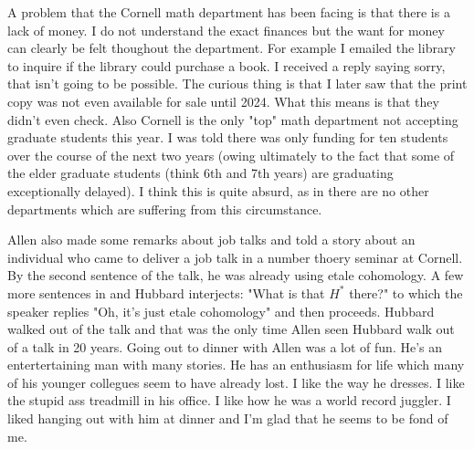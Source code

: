 \documentclass[12pt]{article}
\begin{document}
\hfill

A problem that the Cornell math department has been facing is that there is a lack of money. 
I do not understand the exact finances but the want for money can clearly be felt thoughout the department.
For example I emailed the library to inquire if the library could purchase a book. I received a reply saying sorry, that 
isn't going to be possible. The curious thing is that I later saw that the print copy was not even available for sale until 2024.
What this means is that they didn't even check. Also Cornell is the only "top" math department not accepting graduate students this year.
I was told there was only funding for ten students over the course of the next two years (owing ultimately to the fact that
some of the elder graduate students (think 6th and 7th years) are graduating exceptionally delayed). I think this is quite absurd, as in there are no 
other departments which are suffering from this circumstance.

\hfill

Allen also made some remarks about job talks and told a story about an individual who came to deliver a job talk in a number thoery seminar at Cornell.
By the second sentence of the talk, he was already using etale cohomology. A few more sentences in and Hubbard interjects: "What is that $H^*$ there?" to which
the speaker replies "Oh, it's just etale cohomology" and then proceeds. Hubbard walked out of the talk and that was the only time Allen seen Hubbard walk out of a talk in 20 years.
Going out to dinner with Allen was a lot of fun. He's an entertertaining man with many stories. He has an enthusiasm for life which many of his younger collegues seem to have already lost.
I like the way he dresses. I like the stupid ass treadmill in his office. I like how he was a world record juggler. I liked hanging out with him at dinner and I'm glad that he seems to be fond of me.

\hfill
\end{document}
